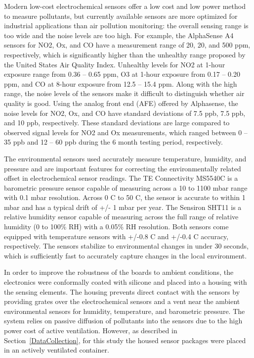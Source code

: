 \documentclass[journal abbreviation, manuscript]{copernicus}
\begin{document}

Modern low-cost electrochemical sensors offer a low cost and low power method to measure pollutants, but currently available sensors are more optimized for industrial applications than air pollution monitoring: the overall sensing range is too wide and the noise levels are too high. For example, the AlphaSense A4 sensors for NO2, Ox, and CO have a measurement range of 20, 20, and 500 ppm, respectively, which is significantly higher than the unhealthy range proposed by the United States Air Quality Index. Unhealthy levels for NO2 at 1-hour exposure range from 0.36 – 0.65 ppm, O3 at 1-hour exposure from 0.17 – 0.20 ppm, and CO at 8-hour exposure from 12.5 – 15.4 ppm. Along with the high range, the noise levels of the sensors make it difficult to distinguish whether air quality is good. Using the analog front end (AFE) offered by Alphasense, the noise levels for NO2, Ox, and CO have standard deviations of 7.5 ppb, 7.5 ppb, and 10 ppb, respectively. These standard deviations are large compared to observed signal levels for NO2 and Ox measurements, which ranged between 0 – 35 ppb and 12 – 60 ppb during the 6 month testing period, respectively.

The environmental sensors used accurately measure temperature, humidity, and pressure and are important features for correcting the environmentally related offset in electrochemical sensor readings. The TE Connectivity MS5540C is a barometric pressure sensor capable of measuring across a 10 to 1100 mbar range with 0.1 mbar resolution. Across 0 C to 50 C, the sensor is accurate to within 1 mbar and has a typical drift of +/- 1 mbar per year. The Sensiron SHT11 is a relative humidity sensor capable of measuring across the full range of relative humidity (0 to 100\% RH) with a 0.05\% RH resolution. Both sensors come equipped with temperature sensors with +/-0.8 C and +/-0.4 C accuracy, respectively. The sensors stabilize to environmental changes in under 30 seconds, which is sufficiently fast to accurately capture changes in the local environment.

In order to improve the robustness of the boards to ambient conditions, the electronics were conformally coated with silicone and placed into a housing with the sensing elements. The housing prevents direct contact with the sensors by providing grates over the electrochemical sensors and a vent near the ambient environmental sensors for humidity, temperature, and barometric pressure. The system relies on passive diffusion of pollutants into the sensors due to the high power cost of active ventilation.  However, as described in Section~\ref{DataCollection}, for this study the housed sensor packages were placed in an actively ventilated container.
\end{document}
